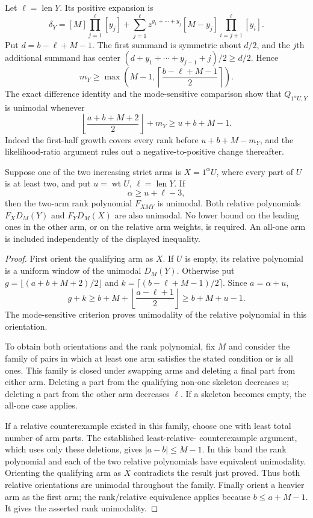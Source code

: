 Let $\ell=\operatorname{len}Y$. Its positive expansion is
\[
 \delta_Y=[M]\prod_{j=1}^{\ell}[y_j]
  +\sum_{j=1}^{\ell}z^{y_1+\cdots+y_j}[M-y_j]
       \prod_{i=j+1}^{\ell}[y_i].
\]
Put $d=b-\ell+M-1$. The first summand is symmetric about $d/2$,
and the $j$th additional summand has center
$(d+y_1+\cdots+y_{j-1}+j)/2\ge d/2$.
Hence
\[
 m_Y\ge \max\left(M-1,\left\lceil
                  \frac{b-\ell+M-1}{2}\right\rceil\right).
\]
The exact difference identity and the mode-sensitive comparison
show that $Q_{1^\alpha U,Y}$ is unimodal whenever
\[
 \left\lfloor\frac{a+b+M+2}{2}\right\rfloor+m_Y
       \ge u+b+M-1.
\]
Indeed the first-half growth covers every rank before
$u+b+M-m_Y$, and the likelihood-ratio argument rules out a
negative-to-positive change thereafter.

\begin{theorem}
Suppose one of the two increasing strict arms is $X=1^\alpha U$,
where every part of $U$ is at least two, and put
$u=\operatorname{wt}U$, $\ell=\operatorname{len}Y$. If
\[
 \alpha\ge u+\ell-3,
\]
then the two-arm rank polynomial $F_{XMY}$ is unimodal.
Both relative polynomials $F_XD_M(Y)$ and $F_YD_M(X)$ are also
unimodal. No lower bound on the leading ones in the other arm,
or on the relative arm weights, is required. An all-one arm is
included independently of the displayed inequality.
\end{theorem}
\begin{proof}
First orient the qualifying arm as $X$. If $U$ is empty, its
relative polynomial is a uniform window of the unimodal $D_M(Y)$.
Otherwise put
$g=\lfloor(a+b+M+2)/2\rfloor$ and
$k=\lceil(b-\ell+M-1)/2\rceil$. Since $a=\alpha+u$,
\[
 g+k\ge b+M+\left\lfloor\frac{a-\ell+1}{2}\right\rfloor
      \ge b+M+u-1.
\]
The mode-sensitive criterion proves unimodality of the relative
polynomial in this orientation.

To obtain both orientations and the rank polynomial, fix $M$ and
consider the family of pairs in which at least one arm satisfies
the stated condition or is all ones. This family is closed under
swapping arms and deleting a final part from either arm. Deleting
a part from the qualifying non-one skeleton decreases $u$;
deleting a part from the other arm decreases $\ell$. If a skeleton
becomes empty, the all-one case applies.

If a relative counterexample existed in this family, choose one
with least total number of arm parts. The established least-relative-
counterexample argument, which uses only these deletions, gives
$|a-b|\le M-1$. In this band the rank polynomial and each of the
two relative polynomials have equivalent unimodality. Orienting
the qualifying arm as $X$ contradicts the result just proved.
Thus both relative orientations are unimodal throughout the
family. Finally orient a heavier arm as the first arm; the
rank/relative equivalence applies because $b\le a+M-1$.
It gives the asserted rank unimodality.
\end{proof}

